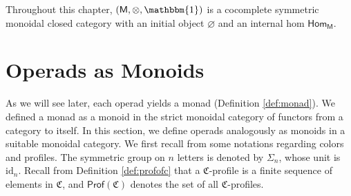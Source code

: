 \documentclass[11pt]{amsbook}
\numberwithin{section}{chapter}
\numberwithin{subsection}{section}
\numberwithin{equation}{section}
\theoremstyle{plain}
\theoremstyle{definition}
\newcommand{\colorc}{\mathfrak{C}}
\newcommand{\Prof}{\mathsf{Prof}}
\newcommand{\Profc}{\Prof(\colorc)}
\newcommand{\M}{\mathsf{M}}
\newcommand{\Hom}{\mathsf{Hom}}
\newcommand{\Homm}{\Hom_{\M}}
\newcommand{\id}{\mathrm{id}}
\newcommand{\tensorunit}{\mathbbm{1}}
\begin{document}
Throughout this chapter, $(\M,\otimes,\tensorunit)$ is a cocomplete symmetric monoidal closed category with an initial object $\varnothing$ and an internal hom $\Homm$.  


\section{Operads as Monoids}\label{sec:operad-monoid}

As we will see later, each operad yields a monad (Definition \ref{def:monad}).  We defined a monad as a monoid in the strict monoidal category of functors from a category to itself.  In this section, we define operads analogously as monoids in a suitable monoidal category.  We first recall from \cite{bluemonster} some notations regarding colors and profiles.  The symmetric group on $n$ letters is denoted by\label{notation:sigman} $\Sigma_n$, whose unit is $\id_n$.  Recall from Definition \ref{def:profofc} that a $\colorc$-profile is a finite sequence of elements in $\colorc$, and $\Profc$ denotes the set of all $\colorc$-profiles.
\end{document}
